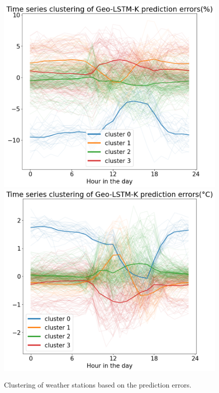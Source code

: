 \documentclass[a4paper,fleqn]{cas-sc}
\begin{document}
\begin{figure}[!h]
	\centering
	\includegraphics[scale=0.22]{figs/new_figs/RHerrorclustering.png}
	\includegraphics[scale=0.22]{figs/new_figs/TEMerrorclustering.png}
	\caption{Clustering of weather stations based on the prediction errors.}
	\label{FIG:clusterError}
\end{figure}
\end{document}
